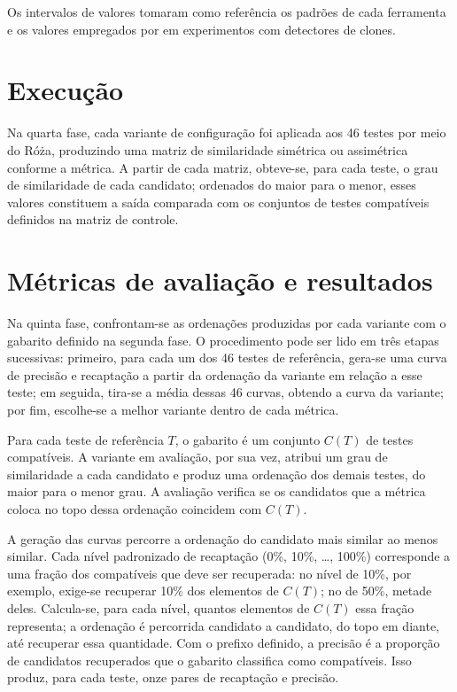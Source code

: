 Os intervalos de valores tomaram como referência os padrões de cada ferramenta e os valores empregados por  em experimentos com detectores de clones.

\section{Execução}

Na quarta fase, cada variante de configuração foi aplicada aos 46 testes por meio do Róża, produzindo uma matriz de similaridade simétrica ou assimétrica conforme a métrica. A partir de cada matriz, obteve-se, para cada teste, o grau de similaridade de cada candidato; ordenados do maior para o menor, esses valores constituem a saída comparada com os conjuntos de testes compatíveis definidos na matriz de controle.

\section{Métricas de avaliação e resultados}

Na quinta fase, confrontam-se as ordenações produzidas por cada variante com o gabarito definido na segunda fase. O procedimento pode ser lido em três etapas sucessivas: primeiro, para cada um dos 46 testes de referência, gera-se uma curva de precisão e recaptação a partir da ordenação da variante em relação a esse teste; em seguida, tira-se a média dessas 46 curvas, obtendo a curva da variante; por fim, escolhe-se a melhor variante dentro de cada métrica.

Para cada teste de referência $T$, o gabarito é um conjunto $C(T)$ de testes compatíveis. A variante em avaliação, por sua vez, atribui um grau de similaridade a cada candidato e produz uma ordenação dos demais testes, do maior para o menor grau. A avaliação verifica se os candidatos que a métrica coloca no topo dessa ordenação coincidem com $C(T)$.

A geração das curvas percorre a ordenação do candidato mais similar ao menos similar. Cada nível padronizado de recaptação (0\%, 10\%, \ldots, 100\%) corresponde a uma fração dos compatíveis que deve ser recuperada: no nível de 10\%, por exemplo, exige-se recuperar 10\% dos elementos de $C(T)$; no de 50\%, metade deles. Calcula-se, para cada nível, quantos elementos de $C(T)$ essa fração representa; a ordenação é percorrida candidato a candidato, do topo em diante, até recuperar essa quantidade. Com o prefixo definido, a precisão é a proporção de candidatos recuperados que o gabarito classifica como compatíveis. Isso produz, para cada teste, onze pares de recaptação e precisão.

